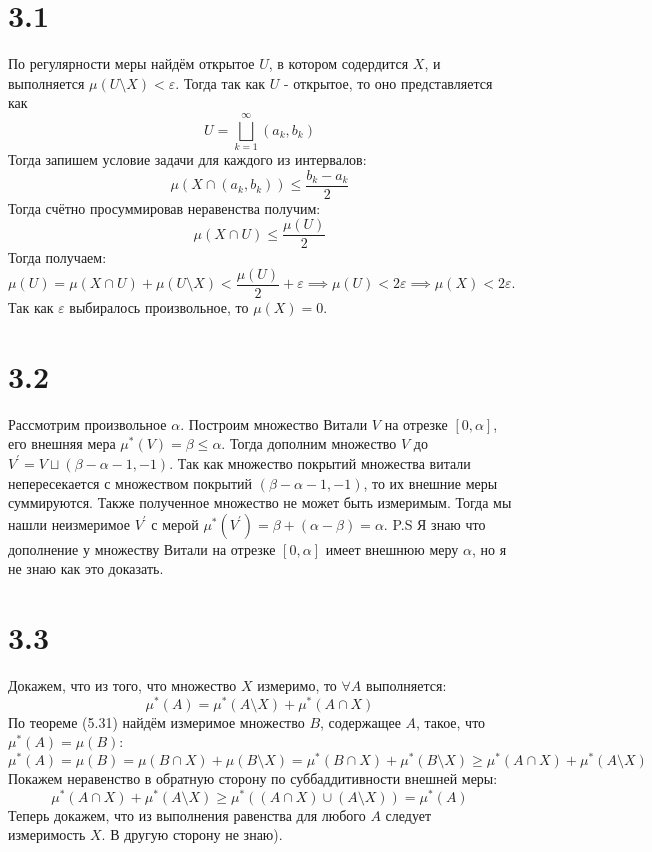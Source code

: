 \documentclass[12pt]{article}
\begin{document}
\section{3.1}
По регулярности меры найдём открытое $U$, в котором содердится $X$, и выполняется $\mu(U \setminus X) < \varepsilon$. 
Тогда так как $U$ - открытое, то оно представляется как 
\[
    U = \bigsqcup_{k=1}^{\infty} (a_k, b_k)
\]    
Тогда запишем условие задачи для каждого из интервалов:
\[
    \mu(X \cap (a_k, b_k)) \leq \frac{b_k - a_k}{2}
\] 
Тогда счётно просуммировав неравенства получим: 
\[
    \mu(X \cap U) \leq \frac{\mu (U)}{2}
\]
Тогда получаем: 
\[
    \mu(U) = \mu(X \cap U) + \mu(U \setminus X) < \frac{\mu (U)}{2} + \varepsilon \implies 
    \mu(U) < 2\varepsilon \implies \mu(X) < 2\varepsilon.
\]
Так как $\varepsilon$ выбиралось произвольное, то $\mu (X) = 0$.  


\section{3.2}
Рассмотрим произвольное $\alpha$. Построим множество Витали $V$ на отрезке $[0, \alpha]$, его внешняя мера
$\mu^{\ast}(V) = \beta \leq \alpha$. Тогда дополним множество $V$ до $V^{\prime} = V \sqcup (\beta - \alpha - 1, -1)$. 
Так как множество покрытий множества витали непересекается с множеством покрытий $(\beta - \alpha - 1, -1)$, то 
их внешние меры суммируются. Также полученное множество не может быть измеримым. Тогда мы нашли неизмеримое 
$V^{\prime}$ с мерой $\mu^{\ast}(V^{\prime}) = \beta + (\alpha - \beta) = \alpha$. 
P.S Я знаю что дополнение у множеству Витали на отрезке $[0, \alpha]$ имеет внешнюю меру $\alpha$, но я не знаю как 
это доказать.    

\section{3.3}
Докажем, что из того, что множество $X$ измеримо, то $\forall A$ выполняется: 
\[
    \mu^{\ast}(A) = \mu^{\ast}(A \setminus X) + \mu^{\ast} (A \cap X)
\]
По теореме (5.31) найдём измеримое множество $B$, 
содержащее $A$, такое, что $\mu^{\ast}(A) = \mu(B)$: 
\[
    \mu^{\ast}(A) = \mu(B) = \mu(B \cap X) + \mu(B \setminus X) = 
    \mu^{\ast} (B \cap X) + \mu^{\ast} (B \setminus X) \geq 
    \mu^{\ast} (A \cap X) + \mu ^{\ast} (A \setminus X) 
\]
Покажем неравенство в обратную сторону по суббаддитивности внешней меры: 
\[
    \mu^{\ast} (A \cap X) + \mu ^{\ast} (A \setminus X) \geq \mu^{\ast}\left( (A \cap X) \cup (A \setminus X) \right) = 
    \mu^{\ast} (A)
\]
Теперь докажем, что из выполнения равенства для любого $A$ следует измеримость $X$.
В другую сторону не знаю). 
\end{document}
